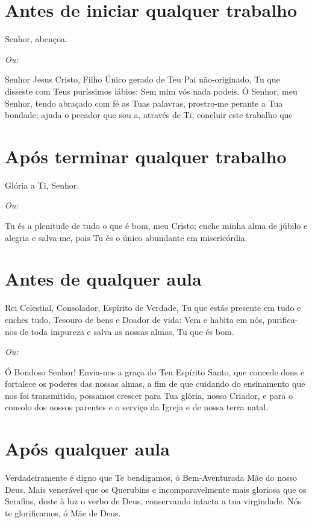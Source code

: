 \documentclass{subfiles}
\begin{document}

\section*{Antes de iniciar qualquer trabalho}

Senhor, abençoa.

\textit{Ou:}

Senhor Jesus Cristo, Filho Único gerado de Teu Pai não-originado, Tu que 
disseste com Teus puríssimos lábios: Sem mim vós nada podeis. Ó Senhor, meu 
Senhor, tendo abraçado com fé as Tuas palavras, prostro-me perante a Tua 
bondade; ajuda o pecador que sou a, através de Ti, concluir este trabalho que 

\section*{Após terminar qualquer trabalho}

Glória a Ti, Senhor.

\textit{Ou:}

Tu és a plenitude de tudo o que é bom, meu Cristo; enche minha alma de júbilo 
e alegria e salva-me, pois Tu és o único abundante em misericórdia. 

 
\section*{Antes de qualquer aula} 

Rei Celestial, Consolador, Espírito de Verdade, Tu que estás presente em tudo 
e enches tudo, Tesouro de bens e Doador de vida: Vem e habita em nós,
purifica-nos de toda impureza e salva as nossas almas, Tu que és bom. 

\textit{Ou:}

Ó Bondoso Senhor! Envia-nos a graça do Teu Espírito Santo, que concede dons e
fortalece os poderes das nossas almas, a fim de que cuidando do ensinamento que
nos foi transmitido, possamos crescer para Tua glória, nosso Criador, e para o
consolo dos nossos parentes e o serviço da Igreja e de nossa terra natal.

\section*{Após qualquer aula}

Verdadeiramente é digno que Te bendigamos, ó Bem-Aven\-turada Mãe do 
nosso Deus. Mais venerável que os Querubins e incomparavelmente mais 
gloriosa que os Serafins, deste à luz o verbo de Deus, conservando intacta a 
tua virgindade. Nós te glorificamos, ó Mãe de Deus.
\end{document}

